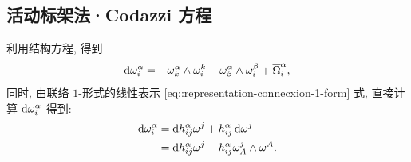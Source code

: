 \documentclass{ctexart}
\begin{document}
\subsection{活动标架法·Codazzi 方程}
利用结构方程, 得到
\[
	\mathop{}\!\mathrm{d}\omega^{\alpha}_{i} = -\omega^{\alpha}_{k} \wedge \omega^{k}_{i} - \omega^{\alpha}_{\beta} \wedge \omega^{\beta}_{i} + \overline{\Omega}^{\alpha}_{i},
\]
同时, 由联络 $1$-形式的线性表示 \ref{eq::representation-connecxion-1-form} 式, 直接计算 $\mathop{}\!\mathrm{d}\omega^{\alpha}_{i}$ 得到:
\begin{align*}
	\mathop{}\!\mathrm{d}\omega^{\alpha}_{i} &= \mathop{}\!\mathrm{d} h^{\alpha}_{ij}\omega^{j} + h^{\alpha}_{ij}\mathop{}\!\mathrm{d}\omega^{j} \\
	&= \mathop{}\!\mathrm{d} h^{\alpha}_{ij}\omega^{j} - h^{\alpha}_{ij}\omega^{j}_{A} \wedge \omega^{A}.
\end{align*}
\end{document}
